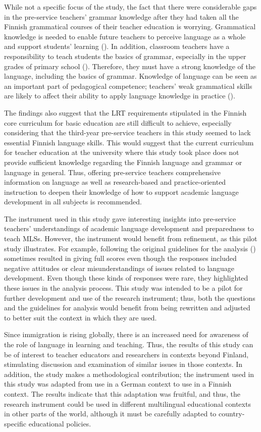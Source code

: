 \documentclass[output=paper]{langscibook}
\begin{document}
While not a specific focus of the study, the fact that there were considerable gaps in the pre-service teachers’ grammar knowledge after they had taken all the Finnish grammatical courses of their teacher education is worrying. Grammatical knowledge is needed to enable future teachers to perceive language as a whole and support students’ learning (\citealt{Myhill2000}). In addition, classroom teachers have a responsibility to teach students the basics of grammar, especially in the upper grades of primary school (\citealt{Tainio2020}). Therefore, they must have a strong knowledge of the language, including the basics of grammar. Knowledge of language can be seen as an important part of pedagogical competence; teachers’ weak grammatical skills are likely to affect their ability to apply language knowledge in practice (\citealt{Rattya2013}).

The findings also suggest that the LRT requirements stipulated in the Finnish core curriculum for basic education are still difficult to achieve, especially considering that the third-year pre-service teachers in this study seemed to lack essential Finnish language skills. This would suggest that the current curriculum for teacher education at the university where this study took place does not provide sufficient knowledge regarding the Finnish language and grammar or language in general. Thus, offering pre-service teachers comprehensive information on language as well as research-based and practice-oriented instruction to deepen their knowledge of how to support academic language development in all subjects is recommended.

The instrument used in this study gave interesting insights into pre-service teachers’ understandings of academic language development and preparedness to teach MLSs. However, the instrument would benefit from refinement, as this pilot study illustrates. For example, following the original guidelines for the analysis (\citealt{CarlsonEtAl2018}) sometimes resulted in giving full scores even though the responses included negative attitudes or clear misunderstandings of issues related to language development. Even though these kinds of responses were rare, they highlighted these issues in the analysis process. This study was intended to be a pilot for further development and use of the research instrument; thus, both the questions and the guidelines for analysis would benefit from being rewritten and adjusted to better suit the context in which they are used.

Since immigration is rising globally, there is an increased need for awareness of the role of language in learning and teaching. Thus, the results of this study can be of interest to teacher educators and researchers in contexts beyond Finland, stimulating discussion and examination of similar issues in those contexts. In addition, the study makes a methodological contribution; the instrument used in this study was adapted from use in a German context to use in a Finnish context. The results indicate that this adaptation was fruitful, and thus, the research instrument could be used in different multilingual educational contexts in other parts of the world, although it must be carefully adapted to country-specific educational policies.
\end{document}
